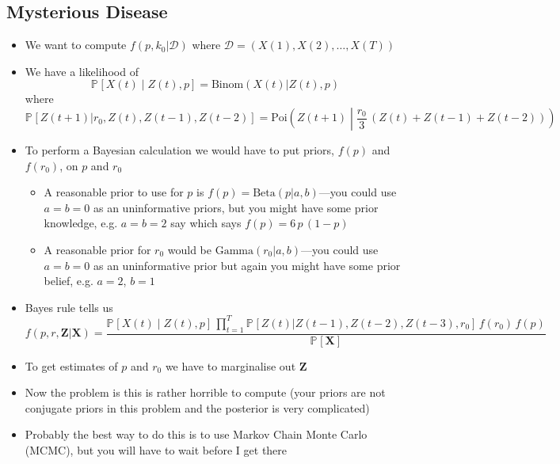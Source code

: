 \documentclass[11pt]{article}
\newcommand{\Prob}[2][]{\mathbb{P}_{#1\!}\left[ #2 \right]}
\begin{document}
\subsection{Mysterious Disease}
\label{sec:org316db8c}
\begin{itemize}
\item We want to compute \(f(p,k_0|\mathcal{D})\) where
\(\mathcal{D}=(X(1), X(2), \ldots, X(T))\)
\item We have a likelihood of 
$$ \Prob{X(t)\middle|Z(t),p} = \mathrm{Binom}(X(t)|Z(t), p) $$
where
$$ \Prob{Z(t+1)|r_0,Z(t),Z(t-1),Z(t-2)} = \mathrm{Poi}\!\left(Z(t+1)\middle|
     \frac{r_0}{3}\, (Z(t)+Z(t-1)+Z(t-2)) \right) $$
\item To perform a Bayesian calculation we would have to put priors,
\(f(p)\) and \(f(r_0)\), on \(p\) and \(r_0\)
\begin{itemize}
\item A reasonable prior to use for \(p\) is \(f(p) =
       \mathrm{Beta}(p|a,b)\)---you could use \(a=b=0\) as an uninformative
priors, but you might have some prior knowledge, e.g. \(a=b=2\) say
which says \(f(p)=6\,p\,(1-p)\)
\item A reasonable prior for \(r_0\) would be
\(\mathrm{Gamma}(r_0|a,b)\)---you could use \(a=b=0\) as an
uninformative prior but again you might have some prior belief, e.g. \(a=2\), \(b=1\)
\end{itemize}
\item Bayes rule tells us
$$ f(p,r,\bm{Z}|\bm{X}) = \frac{\Prob{X(t)\middle|Z(t),p}\, \prod\limits_{t=1}^T
     \Prob{Z(t)|Z(t-1),Z(t-2),Z(t-3),r_0} \,
     f(r_0)\,f(p)}{\Prob{\bm{X}}} $$
\item To get estimates of \(p\) and \(r_0\) we have to marginalise out \(\bm{Z}\)
\item Now the problem is this is rather horrible to compute (your
priors are not conjugate priors in this problem and the posterior
is very complicated)
\item Probably the best way to do this is to use Markov Chain Monte
Carlo (MCMC), but you will have to wait before I get there
\end{itemize}
\end{document}
